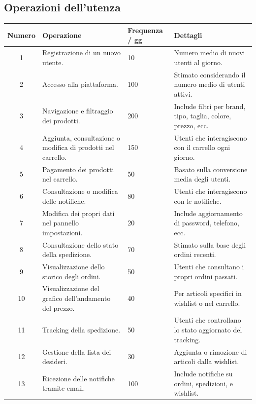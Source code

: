 \documentclass[a4paper,12pt]{report}
\begin{document}
	\subsection{Operazioni dell'utenza}
	\begin{small}
		\begin{longtable}[H]{|c|p{5cm}|>{\columncolor[HTML]{FFFFC7}}p{2.5cm}|p{5cm}|}
			\hline
			\cellcolor[HTML]{ECF4FF}Numero & 
			\cellcolor[HTML]{ECF4FF}Operazione & 
			\cellcolor[HTML]{ECF4FF}Frequenza / gg & 
			\cellcolor[HTML]{ECF4FF}Dettagli \\ \hline
			\endfirsthead
			\endhead
			1 & Registrazione di un nuovo utente. & 10 & Numero medio di nuovi utenti al giorno. \\ \hline
			2 & Accesso alla piattaforma. & 100 & Stimato considerando il numero medio di utenti attivi. \\ \hline
			3 & Navigazione e filtraggio dei prodotti. & 200 & Include filtri per brand, tipo, taglia, colore, prezzo, ecc. \\ \hline
			4 & Aggiunta, consultazione o modifica di prodotti nel carrello. & 150 & Utenti che interagiscono con il carrello ogni giorno. \\ \hline
			5 & Pagamento dei prodotti nel carrello. & 50 & Basato sulla conversione media degli utenti. \\ \hline
			6 & Consultazione o modifica delle notifiche. & 80 & Utenti che interagiscono con le notifiche. \\ \hline
			7 & Modifica dei propri dati nel pannello impostazioni. & 20 & Include aggiornamento di password, telefono, ecc. \\ \hline
			8 & Consultazione dello stato della spedizione. & 70 & Stimato sulla base degli ordini recenti. \\ \hline
			9 & Visualizzazione dello storico degli ordini. & 50 & Utenti che consultano i propri ordini passati. \\ \hline
			10 & Visualizzazione del grafico dell’andamento del prezzo. & 40 & Per articoli specifici in wishlist o nel carrello. \\ \hline
			11 & Tracking della spedizione. & 50 & Utenti che controllano lo stato aggiornato del tracking. \\ \hline
			12 & Gestione della lista dei desideri. & 30 & Aggiunta o rimozione di articoli dalla wishlist. \\ \hline
			13 & Ricezione delle notifiche tramite email. & 100 & Include notifiche su ordini, spedizioni, e wishlist. \\ \hline

\end{longtable}
\end{small}
\end{document}

